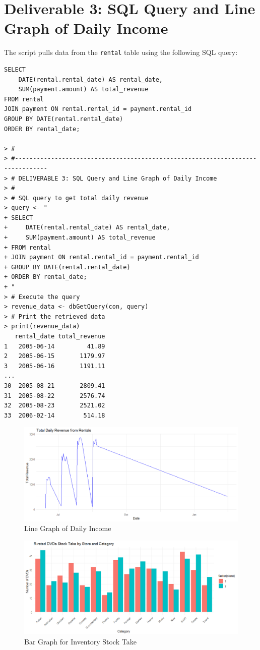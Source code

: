 \documentclass[a4paper,11pt]{extarticle}
\begin{document}
\section*{Deliverable 3: SQL Query and Line Graph of Daily Income}
The script pulls data from the \texttt{rental} table using the following SQL query:
\begin{verbatim}
SELECT 
    DATE(rental.rental_date) AS rental_date, 
    SUM(payment.amount) AS total_revenue
FROM rental
JOIN payment ON rental.rental_id = payment.rental_id
GROUP BY DATE(rental.rental_date)
ORDER BY rental_date;

> #
> #-------------------------------------------------------------------------------
> # DELIVERABLE 3: SQL Query and Line Graph of Daily Income
> #
> # SQL query to get total daily revenue
> query <- "
+ SELECT 
+     DATE(rental.rental_date) AS rental_date, 
+     SUM(payment.amount) AS total_revenue
+ FROM rental
+ JOIN payment ON rental.rental_id = payment.rental_id
+ GROUP BY DATE(rental.rental_date)
+ ORDER BY rental_date;
+ "
> # Execute the query
> revenue_data <- dbGetQuery(con, query)
> # Print the retrieved data
> print(revenue_data)
   rental_date total_revenue
1   2005-06-14         41.89
2   2005-06-15       1179.97
3   2005-06-16       1191.11
...
30  2005-08-21       2809.41
31  2005-08-22       2576.74
32  2005-08-23       2521.02
33  2006-02-14        514.18
\end{verbatim}

\begin{figure}
    \centering
    \includegraphics[width=0.7\linewidth]{line-graph.png}
    \caption{Line Graph of Daily Income}
    \label{fig:linegraph}
\end{figure}
\newpage
\begin{figure}
    \centering
    \includegraphics[width=0.7\linewidth]{bar-graph.png}
    \caption{Bar Graph for Inventory Stock Take}
    \label{fig:enter-label}
\end{figure}
\end{document}
